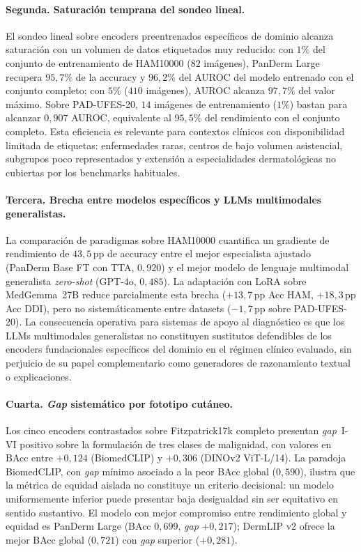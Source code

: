 \paragraph{Segunda. Saturación temprana del sondeo lineal.}
El sondeo lineal sobre encoders preentrenados específicos de
dominio alcanza saturación con un volumen de datos etiquetados muy
reducido: con $1\%$ del conjunto de entrenamiento de HAM10000
($82$ imágenes), PanDerm Large recupera $95{,}7\%$ de la
accuracy y $96{,}2\%$ del AUROC del modelo entrenado con el
conjunto completo; con $5\%$ ($410$ imágenes), AUROC alcanza
$97{,}7\%$ del valor máximo. Sobre PAD-UFES-20, $14$ imágenes
de entrenamiento ($1\%$) bastan para alcanzar $0{,}907$
AUROC, equivalente al $95{,}5\%$ del rendimiento con el conjunto
completo. Esta eficiencia es relevante para contextos clínicos con
disponibilidad limitada de etiquetas: enfermedades raras, centros
de bajo volumen asistencial, subgrupos poco representados y
extensión a especialidades dermatológicas no cubiertas por los
benchmarks habituales.

\paragraph{Tercera. Brecha entre modelos específicos y LLMs
multimodales generalistas.}
La comparación de paradigmas sobre HAM10000 cuantifica un
gradiente de rendimiento de $43{,}5$\,pp de accuracy entre el
mejor especialista ajustado (PanDerm Base FT con TTA, $0{,}920$) y el
mejor modelo de lenguaje multimodal generalista
\emph{zero-shot} (GPT-4o, $0{,}485$). La adaptación con LoRA
sobre MedGemma~27B reduce parcialmente esta brecha
($+13{,}7$\,pp Acc HAM, $+18{,}3$\,pp Acc DDI), pero no
sistemáticamente entre datasets ($-1{,}7$\,pp sobre
PAD-UFES-20). La consecuencia operativa para sistemas de apoyo al
diagnóstico es que los LLMs multimodales generalistas no
constituyen sustitutos defendibles de los encoders fundacionales
específicos del dominio en el régimen clínico evaluado, sin
perjuicio de su papel complementario como generadores de
razonamiento textual o explicaciones.

\paragraph{Cuarta. \emph{Gap} sistemático por fototipo cutáneo.}
Los cinco encoders contrastados sobre Fitzpatrick17k completo
presentan \emph{gap}~I-VI positivo sobre la formulación de tres
clases de malignidad, con valores en BAcc entre $+0{,}124$
(BiomedCLIP) y $+0{,}306$ (DINOv2 ViT-L/14). La paradoja
BiomedCLIP, con \emph{gap} mínimo asociado a la peor BAcc global
($0{,}590$), ilustra que la métrica de equidad aislada no
constituye un criterio decisional: un modelo uniformemente inferior
puede presentar baja desigualdad sin ser equitativo en sentido
sustantivo. El modelo con mejor compromiso entre rendimiento global
y equidad es PanDerm Large (BAcc $0{,}699$, \emph{gap}
$+0{,}217$); DermLIP v2 ofrece la mejor BAcc global
($0{,}721$) con \emph{gap} superior ($+0{,}281$).


